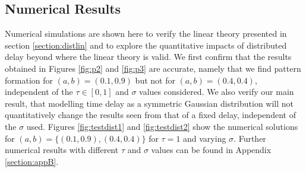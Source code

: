 \subsection{Numerical Results}\label{section:distsim}
Numerical simulations are shown here to verify the linear theory presented in section \ref{section:distlin} and to explore the quantitative impacts of distributed delay beyond where the linear theory is valid. We first confirm that the results obtained in Figures \ref{fig:p2} and \ref{fig:p3} are accurate, namely that we find pattern formation for $(a,b)=(0.1,0.9)$ but not for $(a,b)=(0.4,0.4)$, independent of the $\tau\in[0,1]$ and $\sigma$ values considered. We also verify our main result, that modelling time delay as a symmetric Gaussian distribution will not quantitatively change the results seen from that of a fixed delay, independent of the $\sigma$ used. Figures \ref{fig:testdist1} and \ref{fig:testdist2} show the numerical solutions for $(a,b)=\{(0.1,0.9),(0.4,0.4)\}$ for $\tau=1$ and varying $\sigma$. Further numerical results with different $\tau$ and $\sigma$ values can be found in Appendix \ref{section:appB}.

